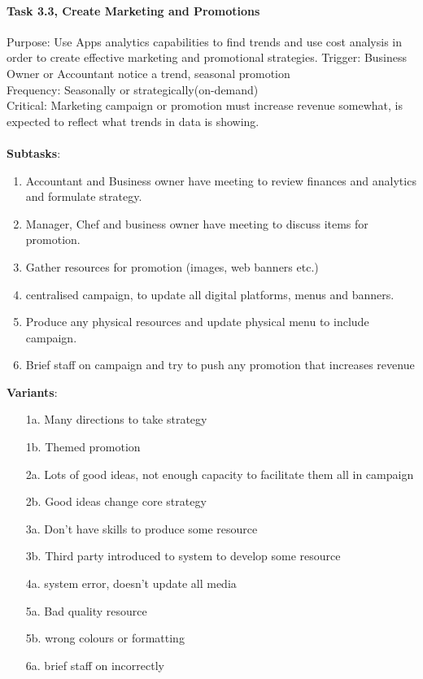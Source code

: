 \documentclass{article}
\begin{document}
\paragraph{Task 3.3, Create Marketing and Promotions }
Purpose: Use Apps analytics capabilities to find trends and use cost analysis in order to create effective marketing and promotional strategies.
Trigger: Business Owner or Accountant notice a trend, seasonal promotion\\
Frequency: Seasonally or strategically(on-demand)\\
Critical: Marketing campaign or promotion must increase revenue somewhat, is expected to reflect what trends in data is showing. \\
\\
\textbf{Subtasks}:
\begin{enumerate}
    \item Accountant and Business owner have meeting to review finances and analytics and formulate strategy.
    \item Manager, Chef and business owner have meeting to discuss items for promotion.
    \item Gather resources for promotion (images, web banners etc.) 
    \item centralised campaign, to update all digital platforms, menus and banners.
    \item Produce any physical resources and update physical menu to include campaign.
    \item Brief staff on campaign and try to push any promotion that increases revenue
\end{enumerate}
\textbf{Variants}:
\begin{enumerate}
    \item [1a.] Many directions to take strategy
    \item [1b.] Themed promotion
    \item [2a.] Lots of good ideas, not enough capacity to facilitate them all in campaign
    \item [2b.] Good ideas change core strategy
    \item [3a.] Don't have skills to produce some resource 
    \item [3b.] Third party introduced to system to develop some resource
    \item [4a.] system error, doesn't update all media
    \item [5a.] Bad quality resource
    \item [5b.] wrong colours or formatting
    \item [6a.] brief staff on incorrectly
\end{enumerate}
\clearpage
\end{document}
